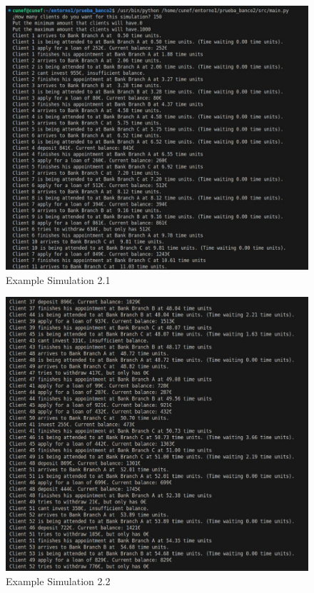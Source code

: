 \documentclass[titlepage, 12pt]{article}
\begin{document}
\begin{figure} [h]
    \centering
    \includegraphics[scale=0.6]{Screenshots/Example Simulation 2.1.jpeg}
    \caption{Example Simulation 2.1}
    \label{fig:Example Simulation 2.1}
\end{figure}

\begin{figure} [h]
    \centering
    \includegraphics[scale=0.6]{Screenshots/Example Simulation 2.2.jpeg}
    \caption{Example Simulation 2.2}
    \label{fig:Example Simulation 2.2}
\end{figure}
\end{document}
